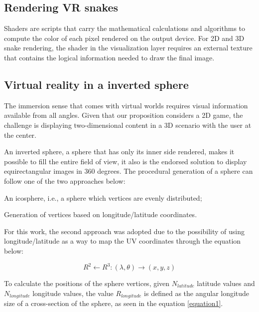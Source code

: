 \documentclass[runningheads]{llncs}
\begin{document}
\subsection{Rendering VR snakes}
\label{subsec:rendering-snakes}
Shaders are scripts that carry the mathematical calculations and algorithms to compute the color of each pixel rendered on the output device. For 2D and 3D snake rendering, the shader in the visualization layer requires an external texture that contains the logical information needed to draw the final image.

\subsection{Virtual reality in a inverted sphere}
\label{subsec:inverted-sphere}
The immersion sense that comes with virtual worlds requires visual information available from all angles. Given that our proposition considers a 2D game, the challenge is displaying two-dimensional content in a 3D scenario with the user at the center.

An inverted sphere, a sphere that has only its inner side rendered, makes it possible to fill the entire field of view, it also is the endorsed solution to display equirectangular images in 360 degrees. The procedural generation of a sphere can follow one of the two approaches below:

\begin{enumerate}
  \begin{item} An icosphere, i.e., a sphere which vertices are evenly distributed;
 \end{item}
  \begin{item} Generation of vertices based on longitude/latitude coordinates. \end{item}
\end{enumerate}

For this work, the second approach was adopted due to the possibility of using longitude/latitude as a way to map the UV coordinates through the equation below:

\begin{equation}
R^2 \leftarrow R^3 : (\lambda, \theta) \rightarrow (x, y, z)
\label{equation1}
\end{equation}

To calculate the positions of the sphere vertices, given $N_{latitude}$ latitude values  and $N_{longitude}$ longitude values, the value $R_{longitude}$ is defined as the angular longitude size of a cross-section of the sphere, as seen in the equation \ref{equation1}.
\end{document}
